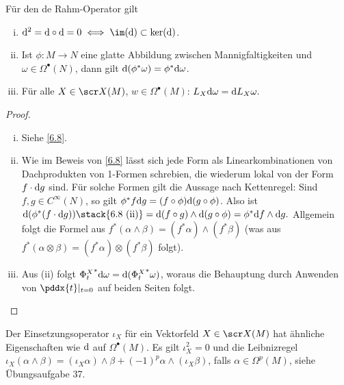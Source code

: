 \begin{st} \label{6.9}
    Für den de Rahm-Operator gilt
    \begin{enumerate}[(i)]
        \item
            $\d^2 = \d \circ \d = 0 \iff \im(\d) \subset \ker(\d)$.
        \item
            Ist $\phi: M \to N$ eine glatte Abbildung zwischen Mannigfaltigkeiten und $\omega \in \Omega^\bullet(N)$, dann gilt $\mathrm{d}(\phi^* \omega) = \phi^* \mathrm{d} \omega$.
        \item
            Für alle $X \in \scr X(M)$, $w \in \Omega^\bullet(M)$:
            \begin{math}
                L_X \mathrm{d} \omega = \mathrm{d} L_X \omega.
            \end{math}
    \end{enumerate}
    \begin{proof}
        \begin{enumerate}[i)]
            \item
                Siehe \ref{6.8}.
            \item
                Wie im Beweis von \ref{6.8} lässt sich jede Form als Linearkombinationen von Dachprodukten von 1-Formen schrebien, die wiederum lokal von der Form $f \cdot \mathrm{d} g$ sind.
                Für solche Formen gilt die Aussage nach Kettenregel:
                Sind $f, g \in C^\infty(N)$, so gilt $\phi^* f \mathrm{d} g = (f \circ \phi) \mathrm{d}(g \circ \phi)$.
                Also ist
                \begin{math}
                    \d(\phi^* (f \cdot \d g))
                    \stack{\text{6.8 (ii)}}= \d(f \circ g) \wedge \d(g \circ \phi)
                    = \phi^* \d f \wedge \d g.
                \end{math}
                Allgemein folgt die Formel aus $f^*(\alpha \wedge \beta) = (f^* \alpha) \wedge (f^* \beta)$ (was aus $f^*(\alpha \otimes \beta) = (f^* \alpha) \otimes (f^* \beta)$ folgt).
            \item
                Aus (ii) folgt ${\Phi^X_t}^* \mathrm{d} \omega = \mathrm{d}({\Phi_t^X}^* \omega)$, woraus die Behauptung durch Anwenden von $\pddx{t}|_{t=0}$ auf beiden Seiten folgt.
        \end{enumerate}
    \end{proof}
\end{st}

\begin{nt} \label{6.10}
    Der Einsetzungsoperator $\iota_X$ für ein Vektorfeld $X \in \scr X(M)$ hat ähnliche Eigenschaften wie $\mathrm{d}$ auf $\Omega^\bullet(M)$.
    Es gilt $\iota_X^2 = 0$ und die Leibnizregel $\iota_X(\alpha \wedge \beta) = (\iota_X \alpha) \wedge \beta + (-1)^p \alpha \wedge (\iota_X \beta)$, falls $\alpha \in \Omega^p(M)$, siehe Übungsaufgabe 37.
\end{nt}

